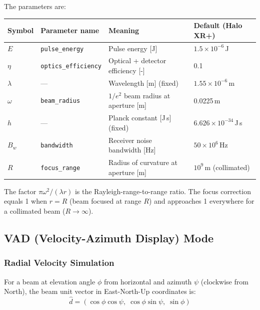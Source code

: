 \documentclass[11pt,letterpaper]{article}
\begin{document}
\noindent The parameters are:
\begin{center}
\begin{tabular}{llll}
\toprule
Symbol    & Parameter name            & Meaning                                   & Default (Halo XR+) \\
\midrule
$E$       & \texttt{pulse\_energy}    & Pulse energy [J]                          & $1.5\times10^{-6}$\,J \\
$\eta$    & \texttt{optics\_efficiency}& Optical + detector efficiency [-]        & 0.1 \\
$\lambda$ & ---                       & Wavelength [m] (fixed)                    & $1.55\times10^{-6}$\,m \\
$\omega$  & \texttt{beam\_radius}     & $1/e^2$ beam radius at aperture [m]       & 0.0225\,m \\
$h$       & ---                       & Planck constant [J\,s] (fixed)            & $6.626\times10^{-34}$\,J\,s \\
$B_w$     & \texttt{bandwidth}        & Receiver noise bandwidth [Hz]             & $50\times10^6$\,Hz \\
$R$       & \texttt{focus\_range}     & Radius of curvature at aperture [m]       & $10^9$\,m (collimated) \\
\bottomrule
\end{tabular}
\end{center}

The factor $\pi\omega^2/(\lambda r)$ is the Rayleigh-range-to-range ratio.
The focus correction equals 1 when $r = R$ (beam focused at range $R$) and
approaches 1 everywhere for a collimated beam ($R \to \infty$).

\subsection{VAD (Velocity-Azimuth Display) Mode}

\subsubsection{Radial Velocity Simulation}

For a beam at elevation angle $\phi$ from horizontal and azimuth $\psi$ (clockwise from North),
the beam unit vector in East-North-Up coordinates is:
\begin{equation}
  \hat{d} = (\cos\phi\cos\psi,\;\cos\phi\sin\psi,\;\sin\phi)
\end{equation}
\end{document}
